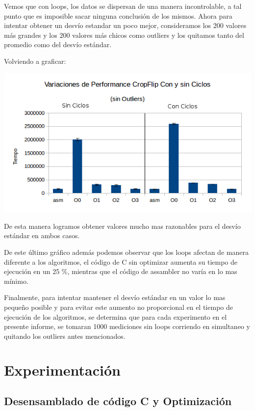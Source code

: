 \documentclass[a4paper]{article}
\begin{document}
Vemos que con loops, los datos se dispersan de una manera incontrolable, a tal punto que es imposible sacar ninguna conclusión de los mismos. Ahora para intentar obtener un desvío estandar un poco mejor, consideramos los $200$ valores más grandes y los $200$ valores más chicos como outliers y los quitamos tanto del promedio como del desvío estándar.

Volviendo a graficar:

\begin{center}
  \includegraphics[scale=0.66]{Graficos1.4/1.3/perSinOut.png}
\end{center}

De esta manera logramos obtener valores mucho mas razonables para el desvío estándar en ambos casos.

De este último gráfico además podemos observar que los loops afectan de manera diferente a los algoritmos, el código de C sin optimizar aumenta su tiempo de ejecución en un 25 \%, mientras que el código de assambler no varía en lo mas mínimo.

Finalmente, para intentar mantener el desvío estándar en un valor lo mas pequeño posible y para evitar este aumento no proporcional en el tiempo de ejecución de los algoritmos, se determina que para cada experimento en el presente informe, se tomaran 1000 mediciones sin loops corriendo en simultaneo y quitando los outliers antes mencionados.

\newpage

\section{Experimentación}

\subsection{Desensamblado de código C y Optimización}
\end{document}
